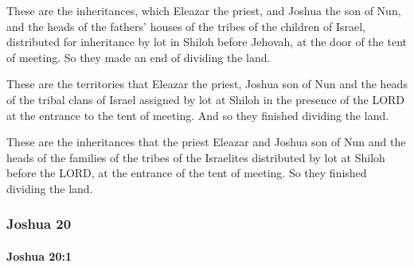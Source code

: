 			\begin{versebox}
					\item[BHS] 
					\item[ASV] These are the inheritances, which Eleazar the priest, and Joshua the son of Nun, and the heads of the fathers' houses of the tribes of the children of Israel, distributed for inheritance by lot in Shiloh before Jehovah, at the door of the tent of meeting. So they made an end of dividing the land.
					\item[NIV] These are the territories that Eleazar the priest, Joshua son of Nun and the heads of the tribal clans of Israel assigned by lot at Shiloh in the presence of the LORD at the entrance to the tent of meeting. And so they finished dividing the land.
					\item[NRSV] These are the inheritances that the priest Eleazar and Joshua son of Nun and the heads of the families of the tribes of the Israelites distributed by lot at Shiloh before the LORD, at the entrance of the tent of meeting. So they finished dividing the land.
			\end{versebox}
	\subsubsection{Joshua 20} %
		\label{JOSHUA-20}

		\paragraph{Joshua 20:1} %
			\label{JOSHUA-20-1}

